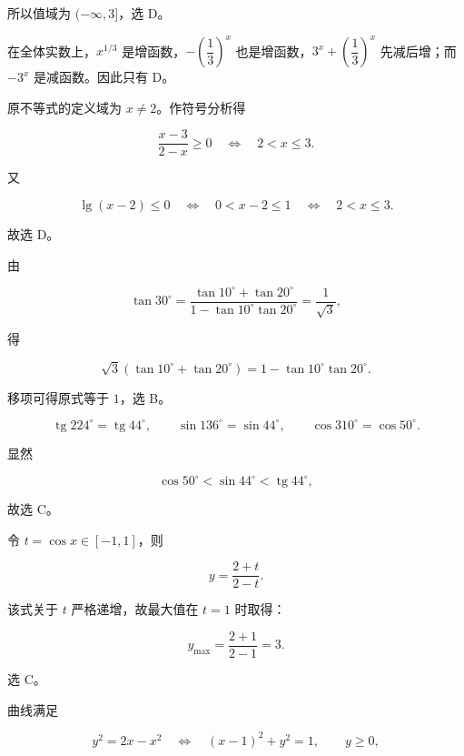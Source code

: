 \begin{answer}
所以值域为 $(-\infty,3]$，选 D。


在全体实数上，$x^{1/3}$ 是增函数，$-\left(\dfrac13\right)^x$ 也是增函数，$3^x+\left(\dfrac13\right)^x$ 先减后增；而 $-3^x$ 是减函数。因此只有 D。


原不等式的定义域为 $x\ne2$。作符号分析得

\nopagebreak[4]
\[
\frac{x-3}{2-x}\ge0
\quad\Longleftrightarrow\quad
2<x\le3.
\]

又

\nopagebreak[4]
\[
\lg(x-2)\le0
\quad\Longleftrightarrow\quad
0<x-2\le1
\quad\Longleftrightarrow\quad
2<x\le3.
\]

故选 D。


由

\nopagebreak[4]
\[
\tan30^\circ
=\frac{\tan10^\circ+\tan20^\circ}
{1-\tan10^\circ\tan20^\circ}
=\frac1{\sqrt3},
\]

得

\nopagebreak[4]
\[
\sqrt3\left(\tan10^\circ+\tan20^\circ\right)
=1-\tan10^\circ\tan20^\circ.
\]

移项可得原式等于 $1$，选 B。


\nopagebreak[4]
\[
\operatorname{tg}224^\circ=\operatorname{tg}44^\circ,\qquad
\sin136^\circ=\sin44^\circ,\qquad
\cos310^\circ=\cos50^\circ.
\]

显然

\nopagebreak[4]
\[
\cos50^\circ<\sin44^\circ<\operatorname{tg}44^\circ,
\]

故选 C。


令 $t=\cos x\in[-1,1]$，则

\nopagebreak[4]
\[
y=\frac{2+t}{2-t}.
\]

该式关于 $t$ 严格递增，故最大值在 $t=1$ 时取得：

\nopagebreak[4]
\[
y_{\max}=\frac{2+1}{2-1}=3.
\]

选 C。


曲线满足

\nopagebreak[4]
\[
y^2=2x-x^2
\quad\Longleftrightarrow\quad
(x-1)^2+y^2=1,\qquad y\ge0,
\]


\end{answer}
